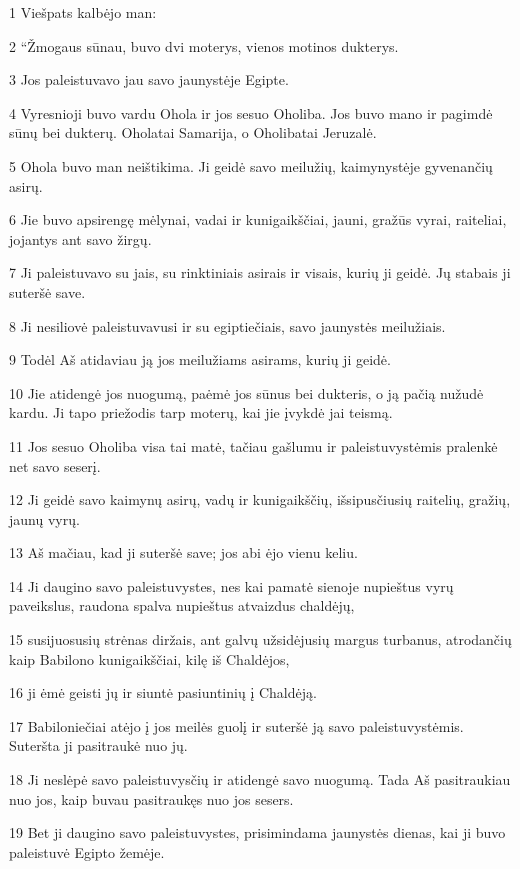 \par 1 Viešpats kalbėjo man: 
\par 2 “Žmogaus sūnau, buvo dvi moterys, vienos motinos dukterys. 
\par 3 Jos paleistuvavo jau savo jaunystėje Egipte. 
\par 4 Vyresnioji buvo vardu Ohola ir jos sesuo Oholiba. Jos buvo mano ir pagimdė sūnų bei dukterų. Ohola­tai Samarija, o Oholiba­tai Jeruzalė. 
\par 5 Ohola buvo man neištikima. Ji geidė savo meilužių, kaimynystėje gyvenančių asirų. 
\par 6 Jie buvo apsirengę mėlynai, vadai ir kunigaikščiai, jauni, gražūs vyrai, raiteliai, jojantys ant savo žirgų. 
\par 7 Ji paleistuvavo su jais, su rinktiniais asirais ir visais, kurių ji geidė. Jų stabais ji suteršė save. 
\par 8 Ji nesiliovė paleistuvavusi ir su egiptiečiais, savo jaunystės meilužiais. 
\par 9 Todėl Aš atidaviau ją jos meilužiams asirams, kurių ji geidė. 
\par 10 Jie atidengė jos nuogumą, paėmė jos sūnus bei dukteris, o ją pačią nužudė kardu. Ji tapo priežodis tarp moterų, kai jie įvykdė jai teismą. 
\par 11 Jos sesuo Oholiba visa tai matė, tačiau gašlumu ir paleistuvystėmis pralenkė net savo seserį. 
\par 12 Ji geidė savo kaimynų asirų, vadų ir kunigaikščių, išsipusčiusių raitelių, gražių, jaunų vyrų. 
\par 13 Aš mačiau, kad ji suteršė save; jos abi ėjo vienu keliu. 
\par 14 Ji daugino savo paleistuvystes, nes kai pamatė sienoje nupieštus vyrų paveikslus, raudona spalva nupieštus atvaizdus chaldėjų, 
\par 15 susijuosusių strėnas diržais, ant galvų užsidėjusių margus turbanus, atrodančių kaip Babilono kunigaikščiai, kilę iš Chaldėjos, 
\par 16 ji ėmė geisti jų ir siuntė pasiuntinių į Chaldėją. 
\par 17 Babiloniečiai atėjo į jos meilės guolį ir suteršė ją savo paleistuvystėmis. Suteršta ji pasitraukė nuo jų. 
\par 18 Ji neslėpė savo paleistuvysčių ir atidengė savo nuogumą. Tada Aš pasitraukiau nuo jos, kaip buvau pasitraukęs nuo jos sesers. 
\par 19 Bet ji daugino savo paleistuvystes, prisimindama jaunystės dienas, kai ji buvo paleistuvė Egipto žemėje. 
